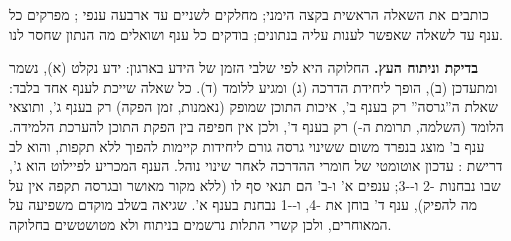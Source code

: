 \begin{pcguide}
כותבים את השאלה הראשית בקצה הימני; מחלקים לשניים עד ארבעה ענפי ; מפרקים כל ענף עד לשאלה
שאפשר לענות עליה בנתונים; בודקים כל ענף ושואלים מה הנתון שחסר לנו.
\end{pcguide}
\textbf{בדיקת  וניתוח העץ.} החלוקה היא לפי שלבי הזמן של הידע בארגון: ידע נקלט (א), נשמר ומתעדכן (ב), הופך ליחידת הדרכה
(ג) ומגיע ללומד (ד). כל שאלה שייכת לענף אחד בלבד: שאלת ה”גרסה” רק בענף ב’, איכות התוכן שמופק (נאמנות, זמן הפקה) רק בענף ג’,
ותוצאי הלומד (השלמה, תרומת ה-) רק בענף ד’, ולכן אין חפיפה בין הפקת התוכן להערכת הלמידה. ענף ב’ מוצג בנפרד משום ששינוי גרסה גורם
ליחידות קיימות להפוך ללא תקפות, והוא לב דרישת : עדכון אוטומטי של חומרי ההדרכה לאחר שינוי נוהל. הענף המכריע לפיילוט הוא ג’,
שבו נבחנות \hyp{2} ו-\hyp{3}; ענפים א’ ו-ב’ הם תנאי סף לו (ללא מקור מאושר ובגרסה תקפה אין על מה להפיק), ענף ד’ בוחן את \hyp{4}, ו-\hyp{1} נבחנת בענף א’.
שגיאה בשלב מוקדם משפיעה על המאוחרים, ולכן קשרי התלות נרשמים בניתוח ולא מטושטשים בחלוקה.

